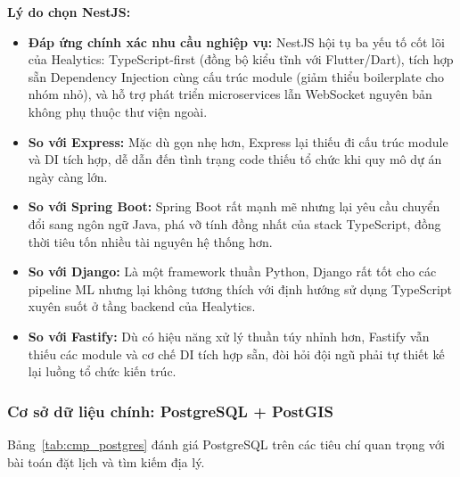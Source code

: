 \textbf{Lý do chọn NestJS:}
\begin{itemize}
    \item \textbf{Đáp ứng chính xác nhu cầu nghiệp vụ:} NestJS hội tụ ba yếu tố cốt lõi của Healytics: TypeScript-first (đồng bộ kiểu tĩnh với Flutter/Dart), tích hợp sẵn Dependency Injection cùng cấu trúc module (giảm thiểu boilerplate cho nhóm nhỏ), và hỗ trợ phát triển microservices lẫn WebSocket nguyên bản không phụ thuộc thư viện ngoài.
    \item \textbf{So với Express:} Mặc dù gọn nhẹ hơn, Express lại thiếu đi cấu trúc module và DI tích hợp, dễ dẫn đến tình trạng code thiếu tổ chức khi quy mô dự án ngày càng lớn.
    \item \textbf{So với Spring Boot:} Spring Boot rất mạnh mẽ nhưng lại yêu cầu chuyển đổi sang ngôn ngữ Java, phá vỡ tính đồng nhất của stack TypeScript, đồng thời tiêu tốn nhiều tài nguyên hệ thống hơn.
    \item \textbf{So với Django:} Là một framework thuần Python, Django rất tốt cho các pipeline ML nhưng lại không tương thích với định hướng sử dụng TypeScript xuyên suốt ở tầng backend của Healytics.
    \item \textbf{So với Fastify:} Dù có hiệu năng xử lý thuần túy nhỉnh hơn, Fastify vẫn thiếu các module và cơ chế DI tích hợp sẵn, đòi hỏi đội ngũ phải tự thiết kế lại luồng tổ chức kiến trúc.
\end{itemize}

\subsubsection{Cơ sở dữ liệu chính: PostgreSQL + PostGIS}

Bảng~\ref{tab:cmp_postgres} đánh giá PostgreSQL trên các tiêu chí quan trọng với bài toán đặt lịch và tìm kiếm địa lý.

